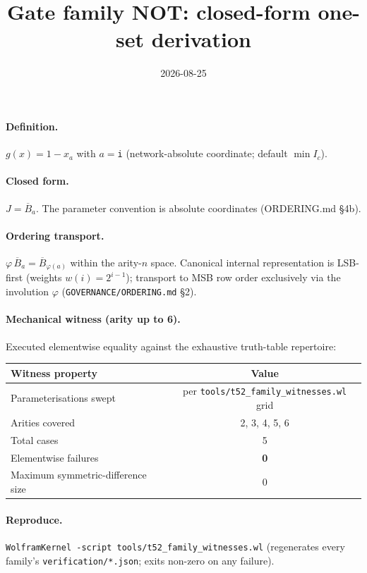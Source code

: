 \documentclass{article}
\title{Gate family NOT: closed-form one-set derivation}
\date{2026-08-25}
\begin{document}
\maketitle

\paragraph{Definition.} $g(x)=1-x_{a}$ with $a=$\texttt{i} (network-absolute coordinate; default $\min I_c$).

\paragraph{Closed form.} $J=\overline{B}_{a}$. The parameter convention is absolute coordinates (ORDERING.md \S4b).

\paragraph{Ordering transport.} $\varphi\,\overline{B}_{a}=\overline{B}_{\varphi(a)}$ within the arity-$n$ space.
Canonical internal representation is LSB-first (weights $w(i)=2^{i-1}$);
transport to MSB row order exclusively via the involution $\varphi$
(\texttt{GOVERNANCE/ORDERING.md} \S2).

\paragraph{Mechanical witness (arity up to 6).} Executed elementwise equality
against the exhaustive truth-table repertoire:
\begin{center}
\begin{tabular}{lc}
\hline
Witness property & Value \\ \hline
Parameterisations swept & per \texttt{tools/t52_family_witnesses.wl} grid \\
Arities covered & 2, 3, 4, 5, 6 \\
Total cases & 5 \\
Elementwise failures & \textbf{0} \\
Maximum symmetric-difference size & 0 \\ \hline
\end{tabular}
\end{center}

\paragraph{Reproduce.} \texttt{WolframKernel -script tools/t52_family_witnesses.wl}
(regenerates every family's \texttt{verification/*.json}; exits non-zero on any failure).
\end{document}
